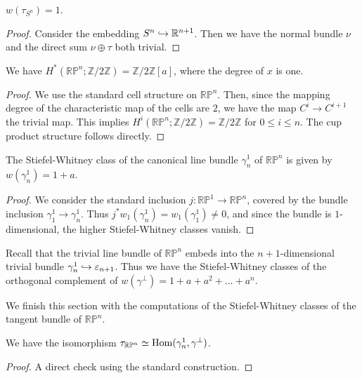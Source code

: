 	\begin{coro}
		$w(\tau_{S^n})=1$. 
	\end{coro}
	\begin{proof}
		Consider the embedding $S^n\hookrightarrow\mathbb{R}^{n+1}$. Then we have the normal bundle $\nu$ and the direct sum $\nu\oplus\tau$ both trivial. 
	\end{proof}

	\begin{prop}
		We have $H^*(\mathbb{RP}^n;\mathbb{Z}/2\mathbb{Z})=\mathbb{Z}/2\mathbb{Z}[a]$, where the degree of $x$ is one. 
	\end{prop}
	\begin{proof}
		We use the standard cell structure on $\mathbb{RP}^n$. Then, since the mapping degree of the characteristic map of the cells are $2$, we have the map $C^i\to C^{i+1}$ the trivial map. This implies $H^i(\mathbb{RP}^n;\mathbb{Z}/2\mathbb{Z})=\mathbb{Z}/2\mathbb{Z}$ for $0\le i\le n$. The cup product structure follows directly. 
	\end{proof}

	\begin{prop}
		The Stiefel-Whitney class of the canonical line bundle $\gamma^1_n$ of $\mathbb{RP}^n$ is given by $w(\gamma^1_n)=1+a$. 
	\end{prop}
	\begin{proof}
		We consider the standard inclusion $j:\mathbb{RP}^1\to\mathbb{RP}^n$, covered by the bundle inclusion $\gamma^1_1\to\gamma^1_n$. Thus $j^*w_1(\gamma_n^1)=w_1(\gamma_1^1)\ne0$, and since the bundle is $1$-dimensional, the higher Stiefel-Whitney classes vanish. 
	\end{proof}

	\begin{coro}
		Recall that the trivial line bundle of $\mathbb{RP}^n$ embeds into the $n+1$-dimensional trivial bundle $\gamma_n^1\hookrightarrow\varepsilon_{n+1}$. Thus we have the Stiefel-Whitney classes of the orthogonal complement of $w(\gamma^\bot)=1+a+a^2+\dots+a^n$. 
	\end{coro}

	We finish this section with the computations of the Stiefel-Whitney classes of the tangent bundle of $\mathbb{RP}^n$. 

	\begin{lemma}
		We have the isomorphism $\tau_{\mathbb{RP}^n}\simeq\operatorname{\mathrm{Hom}}(\gamma_n^1,\gamma^\bot)$. 
	\end{lemma}
	\begin{proof}
		A direct check using the standard construction. 
	\end{proof}

